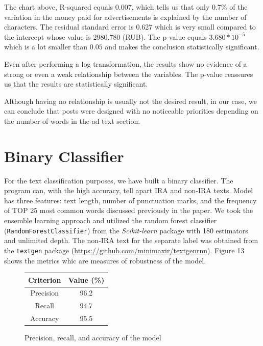 \documentclass{article}
\begin{document}
The chart above, R-squared equals 0.007, which tells us that only 0.7\%
of the variation in the money paid for advertisements is explained by the
number of characters. The residual standard error is 0.627 which is very small
compared to the intercept whose value is 2980.780 (RUB). The p-value equals
$3.680 * 10^{-5}$ which is a lot smaller than $0.05$ and makes the conclusion
statistically significant.

\medskip

Even after performing a log transformation, the results show no evidence of a
strong or even a weak relationship between the variables. The p-value reassures
us that the results are statistically significant.

\medskip

Although having no relationship is usually not the desired result, in our case,
we can conclude that posts were designed with no noticeable priorities
depending on the number of words in the ad text section.


\section{Binary Classifier}

For the text classification purposes, we have built a binary classifier. The
program can, with the high accuracy, tell apart IRA and non-IRA texts. Model
has three features: text length, number of punctuation marks, and the frequency
of TOP 25 most common words discussed previously in the paper. We took the
ensemble learning approach and utilized the random forest classifier
(\texttt{RandomForestClassifier}) from the \textit{Scikit-learn} package with
180 estimators and unlimited depth. The non-IRA text for the separate label was
obtained from the \texttt{textgen} package
(\url{https://github.com/minimaxir/textgenrnn}). Figure 13 shows the metrics
whic are measures of robustness of the model.

\begin{figure}[H]
  \centering
  \begin{tabular}{*{2}{c}}
    \toprule
    Criterion & Value (\%)\\
    \midrule
    Precision & 96.2\\
    \midrule
    Recall    & 94.7\\
    \midrule
    Accuracy  & 95.5\\
    \bottomrule
  \end{tabular}
  \caption{Precision, recall, and accuracy of the model}
\end{figure}
\end{document}
